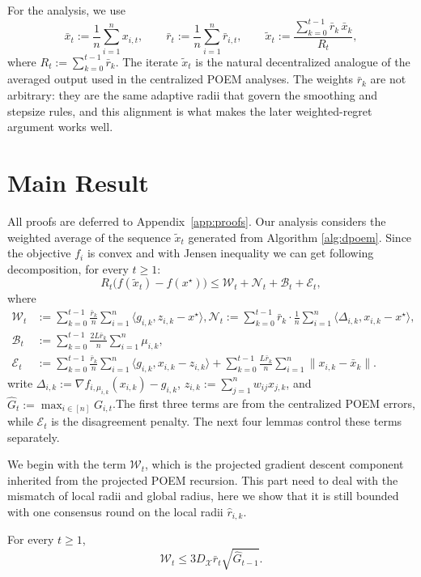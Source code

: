 \documentclass[runningheads]{llncs}
\begin{document}
For the analysis, we use
\[
\bar x_t:=\frac{1}{n}\sum_{i=1}^n x_{i,t},
\qquad
\bar r_t:=\frac{1}{n}\sum_{i=1}^n \bar r_{i,t},
\qquad
\tilde{x}_t
:=
\frac{\sum_{k=0}^{t-1}\bar r_k\,\bar x_k}{R_t},
\]
where \(R_t:=\sum_{k=0}^{t-1}\bar r_k\). The iterate \(\tilde x_t\) is the
natural decentralized analogue of the averaged output used in the centralized
POEM analyses. The weights \(\bar r_k\) are not arbitrary: they are the same
adaptive radii that govern the smoothing and stepsize rules, and this
alignment is what makes the later weighted-regret argument works well.



\section{Main Result}
All proofs are deferred to Appendix~\ref{app:proofs}.
Our analysis considers the weighted average of the 
sequence $\tilde{x}_t$ generated from Algorithm \ref{alg:dpoem}. 
Since the objective $f_{i}$ is convex and with Jensen inequality 
we can get following decomposition, for every \(t\ge 1\):
\begin{equation}
\label{eq:main-decomposition}
R_t\bigl(f(\tilde x_t)-f(x^\star)\bigr)
\le
\mathcal W_t+\mathcal N_t+\mathcal B_t+\mathcal E_t,
\end{equation}
where 
\begin{align*}
\mathcal W_t
&:=
\sum_{k=0}^{t-1}\frac{\bar r_k}{n}\sum_{i=1}^{n}\langle g_{i,k},z_{i,k}-x^\star\rangle,
\mathcal N_t
:=
\sum_{k=0}^{t-1}\bar r_k\cdot \frac{1}{n}\sum_{i=1}^{n}
\langle \Delta_{i,k},x_{i,k}-x^\star\rangle,\\
\mathcal B_t
&:=
\sum_{k=0}^{t-1}\frac{2L\bar r_k}{n}\sum_{i=1}^{n}\mu_{i,k},\\
\mathcal E_t
&:=
\sum_{k=0}^{t-1}\frac{\bar r_k}{n}\sum_{i=1}^{n}\langle g_{i,k},x_{i,k}-z_{i,k}\rangle
+
\sum_{k=0}^{t-1}\frac{L\bar r_k}{n}\sum_{i=1}^{n}\|x_{i,k}-\bar x_k\|.
\end{align*}
write \(\Delta_{i,k}:=\nabla f_{i,\mu_{i,k}}(x_{i,k})-g_{i,k}\),
\(z_{i,k}:=\sum_{j=1}^n w_{ij}x_{j,k}\), and
\(\hat G_t:=\max_{i\in[n]} G_{i,t}\).The first three terms are 
from the centralized POEM errors, while \(\mathcal E_t\) is 
the disagreement penalty. The next four lemmas control
these terms separately.

We begin with the term \(\mathcal W_t\), which is the projected gradient 
descent component inherited from the projected POEM recursion. This part 
need to deal with the mismatch of local radii and global radius, here we 
show that it is still bounded with one consensus round on the local radii $\hat r_{i,k}$.
\begin{lemma}\label{lem:weighted-regret}
For every \(t\ge 1\),
\[
\mathcal W_t
\le
3D_{\mathcal{X}}\bar r_t\sqrt{\hat G_{t-1}}.
\]
\end{lemma}
\end{document}
